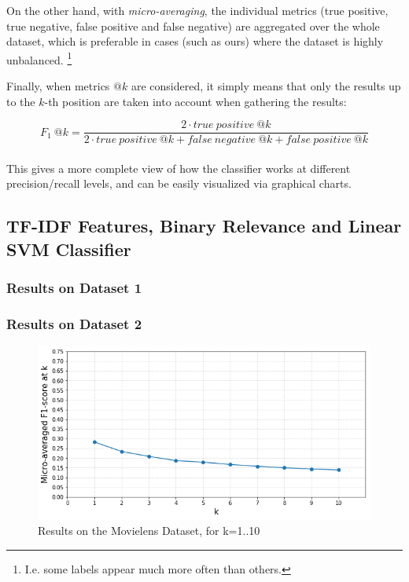On the other hand, with \textit{micro-averaging}, the individual metrics (true positive, true negative, false positive and false negative) are aggregated over the whole dataset, which is preferable in cases (such as ours) where the dataset is highly unbalanced. \footnote{I.e. some labels appear much more often than others.}  

Finally, when metrics $@k$ are considered, it simply means that only the results up to the $k$-th position are taken into account when gathering the results:

\begin{equation}
F_1\ @k = \frac{2 \cdot true \ positive\ @k}{2 \cdot true \ positive\ @k + false \ negative\ @k + false \ positive\ @k} 
\end{equation}\\

This gives a more complete view of how the classifier works at different precision/recall levels, and can be easily visualized via graphical charts.


\subsection{TF-IDF Features, Binary Relevance and Linear SVM Classifier}



\subsubsection{Results on Dataset 1}



\subsubsection{Results on Dataset 2}

\begin{figure}[!h]
    \centering
    \includegraphics[width=\textwidth]{chapters/05_experiments/images/ovr-svm-movielens.png}
    \caption{Results on the Movielens Dataset, for k=1..10}
    \label{fig:ovr_svm_movielens}
\end{figure}

